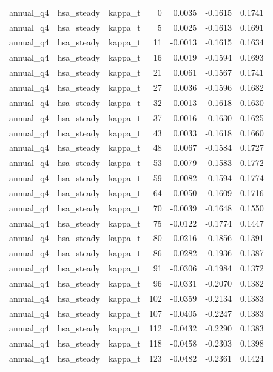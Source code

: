 \begin{tabular}{lllrrrr}
annual\_q4 & hsa\_steady & kappa\_t & 0 & 0.0035 & -0.1615 & 0.1741 \\
annual\_q4 & hsa\_steady & kappa\_t & 5 & 0.0025 & -0.1613 & 0.1691 \\
annual\_q4 & hsa\_steady & kappa\_t & 11 & -0.0013 & -0.1615 & 0.1634 \\
annual\_q4 & hsa\_steady & kappa\_t & 16 & 0.0019 & -0.1594 & 0.1693 \\
annual\_q4 & hsa\_steady & kappa\_t & 21 & 0.0061 & -0.1567 & 0.1741 \\
annual\_q4 & hsa\_steady & kappa\_t & 27 & 0.0036 & -0.1596 & 0.1682 \\
annual\_q4 & hsa\_steady & kappa\_t & 32 & 0.0013 & -0.1618 & 0.1630 \\
annual\_q4 & hsa\_steady & kappa\_t & 37 & 0.0016 & -0.1630 & 0.1625 \\
annual\_q4 & hsa\_steady & kappa\_t & 43 & 0.0033 & -0.1618 & 0.1660 \\
annual\_q4 & hsa\_steady & kappa\_t & 48 & 0.0067 & -0.1584 & 0.1727 \\
annual\_q4 & hsa\_steady & kappa\_t & 53 & 0.0079 & -0.1583 & 0.1772 \\
annual\_q4 & hsa\_steady & kappa\_t & 59 & 0.0082 & -0.1594 & 0.1774 \\
annual\_q4 & hsa\_steady & kappa\_t & 64 & 0.0050 & -0.1609 & 0.1716 \\
annual\_q4 & hsa\_steady & kappa\_t & 70 & -0.0039 & -0.1648 & 0.1550 \\
annual\_q4 & hsa\_steady & kappa\_t & 75 & -0.0122 & -0.1774 & 0.1447 \\
annual\_q4 & hsa\_steady & kappa\_t & 80 & -0.0216 & -0.1856 & 0.1391 \\
annual\_q4 & hsa\_steady & kappa\_t & 86 & -0.0282 & -0.1936 & 0.1387 \\
annual\_q4 & hsa\_steady & kappa\_t & 91 & -0.0306 & -0.1984 & 0.1372 \\
annual\_q4 & hsa\_steady & kappa\_t & 96 & -0.0331 & -0.2070 & 0.1382 \\
annual\_q4 & hsa\_steady & kappa\_t & 102 & -0.0359 & -0.2134 & 0.1383 \\
annual\_q4 & hsa\_steady & kappa\_t & 107 & -0.0405 & -0.2247 & 0.1383 \\
annual\_q4 & hsa\_steady & kappa\_t & 112 & -0.0432 & -0.2290 & 0.1383 \\
annual\_q4 & hsa\_steady & kappa\_t & 118 & -0.0458 & -0.2303 & 0.1398 \\
annual\_q4 & hsa\_steady & kappa\_t & 123 & -0.0482 & -0.2361 & 0.1424 \\

\end{tabular}
